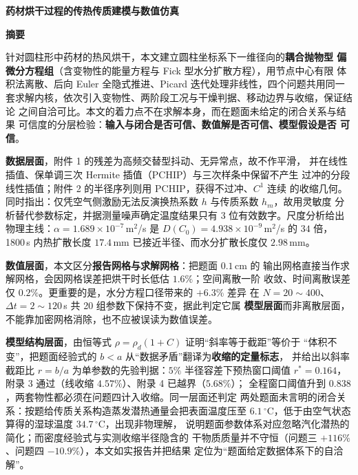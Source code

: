 \documentclass[12pt,a4paper,fontset=none]{ctexart}
\begin{document}
\begin{center}
  {\bfseries 药材烘干过程的传热传质建模与数值仿真}
\end{center}

\vspace{0.5em}
\begin{center}
  {\bfseries 摘\quad 要}
\end{center}

\noindent
针对圆柱形中药材的热风烘干，本文建立圆柱坐标系下一维径向的\textbf{耦合抛物型
偏微分方程组}（含变物性的能量方程与 Fick 型水分扩散方程），用节点中心有限
体积法离散、后向 Euler 全隐式推进、Picard 迭代处理非线性，四个问题共用同一
套求解内核，依次引入变物性、两阶段工况与干燥判据、移动边界与收缩，保证结论
之间自洽可比。本文的着力点不在求解本身，而在题面未给定的闭合关系与结果
可信度的分层检验：\textbf{输入与闭合是否可信、数值解是否可信、模型假设是否
可信}。

\textbf{数据层面}，附件 1 的残差为高频交替型抖动、无异常点，故不作平滑，
并在线性插值、保单调三次 Hermite 插值（PCHIP）与三次样条中保留不产生
过冲的分段线性插值；附件 2 的半径序列则用 PCHIP，获得不过冲、$C^1$ 连续
的收缩几何。
同时指出：仅凭空气侧激励无法反演换热系数 $h$ 与传质系数 $h_m$，故用灵敏度
分析替代参数标定，并据测量噪声确定温度结果只有 3 位有效数字。尺度分析给出
物理主线：$\alpha=1.689\times10^{-7}$\,m$^2$/s 是
$D(C_0)=4.938\times10^{-9}$\,m$^2$/s 的 $34$ 倍，1800\,s 内热扩散长度
$17.4$\,mm 已接近半径、而水分扩散长度仅 $2.98$\,mm。

\textbf{数值层面}，本文区分\textbf{报告网格与求解网格}：把题面 $0.1$\,cm 的
输出网格直接当作求解网格，会因网格误差把烘干时长低估 $1.6\%$；空间离散一阶
收敛、时间离散误差仅 $0.2\%$。更重要的是，水分方程口径带来的 $+6.3\%$ 差异
在 $N=20\sim400$、$\Delta t=2\sim120$\,s 共 20 组参数下保持不变，据此判定它属
\textbf{模型层面}而非离散层面，不能靠加密网格消除，也不应被误读为数值误差。

\textbf{模型结构层面}，由恒等式 $\rho=\rho_d(1+C)$ 证明“斜率等于截距”等价于
“体积不变”，把题面经验式的 $b<a$ 从“数据矛盾”翻译为\textbf{收缩的定量标志}，
并给出以斜率截距比 $r=b/a$ 为单参数的先验判据：$5\%$ 半径容差下预热窗口阈值
$r^\ast=0.164$，附录 3 通过（线收缩 $4.57\%$）、附录 4 已越界（$5.68\%$）；
全程窗口阈值升到 $0.838$，两套物性都必须在问题四计入收缩。同一层面还判定
两处题面未言明的闭合关系：按题给传质关系构造蒸发潜热通量会把表面温度压至
$6.1\,^\circ$C，低于由空气状态算得的湿球温度 $34.7\,^\circ$C，出现非物理解，
说明题面参数体系对应忽略汽化潜热的简化；而密度经验式与实测收缩半径隐含的
干物质质量并不守恒（问题三 $+116\%$、问题四 $-10.9\%$），本文如实报告并把结果
定位为“题面给定数据体系下的自洽解”。
\end{document}
